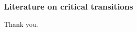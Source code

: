 \documentclass[./main.tex]{subfiles}
\begin{document}
\begin{frame}[label=slide07]
        \frametitle{Literature on critical transitions}

        \nocite{*}
        
        

        \vspace{1cm}

        Thank you.

        \bigskip

        \hyperlink{slide02}{}
        \hyperlink{slide03}{}

\end{frame}
\end{document}
